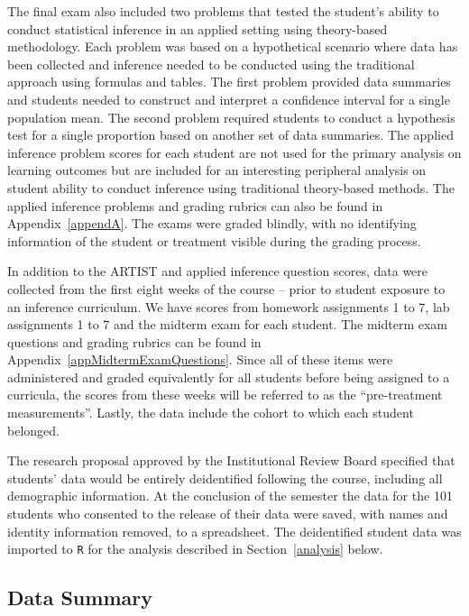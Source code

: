The final exam also included two problems that tested the student's ability to conduct statistical inference in an applied setting using theory-based methodology. Each problem was based on a hypothetical scenario where data has been collected and inference needed to be conducted using the traditional approach using formulas and tables. The first problem provided data summaries and students needed to construct and interpret a confidence interval for a single population mean. The second problem required students to conduct a hypothesis test for a single proportion based on another set of data summaries. The applied inference problem scores for each student are not used for the primary analysis on learning outcomes but are included for an interesting peripheral analysis on student ability to conduct inference using traditional theory-based methods. The applied inference problems and grading rubrics can also be found in Appendix~\ref{appendA}. The exams were graded blindly, with no identifying information of the student or treatment visible during the grading process.

In addition to the ARTIST and applied inference question scores, data were collected from the first eight weeks of the course -- prior to student exposure to an inference curriculum. We have scores from homework assignments 1 to 7, lab assignments 1 to 7 and the midterm exam for each student. The midterm exam questions and grading rubrics can be found in Appendix~\ref{appMidtermExamQuestions}. Since all of these items were administered and graded equivalently for all students before being assigned to a curricula, the scores from these weeks will be referred to as the ``pre-treatment measurements''. Lastly, the data include the cohort to which each student belonged.

The research proposal approved by the Institutional Review Board specified that students' data would be entirely deidentified following the course, including all demographic information.  At the conclusion of the semester the data for the 101 students who consented to the release of their data were saved, with names and identity information removed, to a spreadsheet.  The deidentified student data was imported to \texttt{R} for the analysis described in Section~\ref{analysis} below. 


\subsection{Data Summary}
\label{dataSummary}

